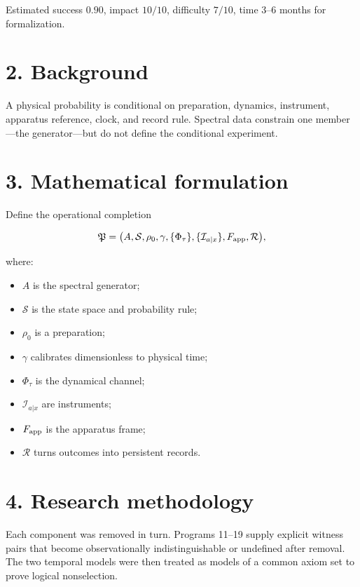 \documentclass[11pt,a4paper,openany]{report}
\begin{document}
Estimated success \(0.90\), impact \(10/10\), difficulty \(7/10\), time 3–6 months for formalization.

\section{2. Background}

A physical probability is conditional on preparation, dynamics, instrument, apparatus reference, clock, and record rule. Spectral data constrain one member—the generator—but do not define the conditional experiment.

\section{3. Mathematical formulation}

Define the operational completion

\[
\mathfrak P=
\bigl(
A,\mathcal S,\rho_0,\gamma,
\{\Phi_\tau\},
\{\mathcal I_{a|x}\},
F_{\rm app},
\mathcal R
\bigr),
\]

where:

\begin{itemize}
\item 
\(A\) is the spectral generator;

\item 
\(\mathcal S\) is the state space and probability rule;

\item 
\(\rho_0\) is a preparation;

\item 
\(\gamma\) calibrates dimensionless to physical time;

\item 
\(\Phi_\tau\) is the dynamical channel;

\item 
\(\mathcal I_{a|x}\) are instruments;

\item 
\(F_{\rm app}\) is the apparatus frame;

\item 
\(\mathcal R\) turns outcomes into persistent records.

\end{itemize}

\section{4. Research methodology}

Each component was removed in turn. Programs 11–19 supply explicit witness pairs that become observationally indistinguishable or undefined after removal. The two temporal models were then treated as models of a common axiom set to prove logical nonselection.
\end{document}
